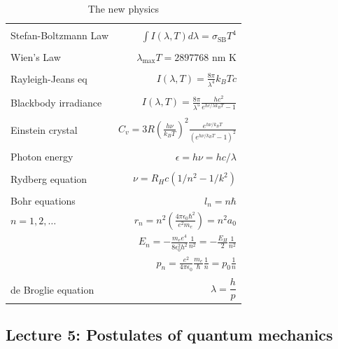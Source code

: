 \documentclass[11pt]{article}
\begin{document}
\begin{table} 
\begin{center}
    \caption{The new physics}
    \begin{tabular}{|lr|}
     \hline
 & \\
Stefan-Boltzmann Law & $\displaystyle  \int I(\lambda,T)d\lambda = \sigma_\mathrm{SB} T^4$
\\ & \\
Wien's Law & $\displaystyle \lambda_\mathrm{max}T=2897768$ nm K \\
 & \\
Rayleigh-Jeans eq& $\displaystyle I(\lambda,T) = \frac{8\pi}{\lambda^4} k_B T c $ \\ 
& \\
Blackbody irradiance & $\displaystyle I(\lambda, T) =
\frac{8\pi}{\lambda^5}\frac{hc^2}{e^{hc/\lambda k_B T}-1}$ \\ 
& \\
Einstein crystal & $\displaystyle C_v=3R \left(\frac{h\nu}{k_BT}\right )^2\frac{e^{h\nu/k_BT}}{\left
            ( e^{h\nu/k_BT}-1 \right )^2}$ \\
& \\
Photon energy & $\displaystyle \epsilon=h\nu = hc/\lambda $ \\
& \\
Rydberg equation & $\displaystyle \nu = R_H c\left (1/n^2
        -1/k^2 \right)$ \\
& \\
Bohr equations & $\displaystyle l_n=n \hbar$ \\
$\displaystyle n=1,2, \ldots $ & $\displaystyle r_n = n^2 \left ( \frac{4 \pi
    \epsilon_0 \hbar^2}{e^2 m_e} \right ) = n^2 a_0$ \\
 & $\displaystyle E_n =-\frac{m_e e^4}{8\epsilon_0^2
   h^2}\frac{1}{n^2}=-\frac{E_H}{2}\frac{1}{n^2}$ \\ 
 & $\displaystyle p_n =\frac{e^2}{4\pi\epsilon_0}\frac{m_e}{\hbar}\frac{1}{n} =
p_0 \frac{1}{n} $ \\
& \\
de Broglie equation & $ \displaystyle \lambda=\dfrac{h}{p}$ \\
\hline
\end{tabular}
\end{center}
\end{table}
\subsection{Lecture 5: Postulates of quantum mechanics}
\label{sec:org546f3cd}
\end{document}
